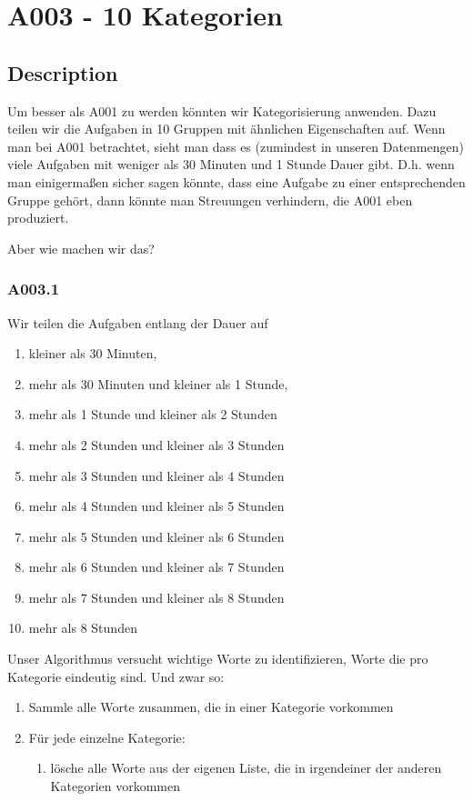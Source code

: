 \newpage{}

\hypertarget{a003---10-categories}{%
\section{A003 - 10 Kategorien}\label{a003---10-categories}}

\hypertarget{description}{%
\subsection{Description}}

Um besser als A001 zu werden könnten wir Kategorisierung anwenden.
Dazu teilen wir die Aufgaben in 10 Gruppen mit ähnlichen Eigenschaften auf.
Wenn man bei A001 betrachtet, sieht man dass es (zumindest in unseren Datenmengen) viele Aufgaben mit weniger als 30 Minuten und 1 Stunde Dauer gibt. D.h. wenn man einigermaßen sicher sagen könnte, dass eine Aufgabe zu einer entsprechenden Gruppe gehört, dann könnte man Streuungen verhindern, die A001 eben produziert.

Aber wie machen wir das?

\subsubsection{A003.1}

Wir teilen die Aufgaben entlang der Dauer auf
\begin{enumerate}
\tightlist
\item kleiner als 30 Minuten,
\item mehr als 30 Minuten und kleiner als 1 Stunde,
\item mehr als 1 Stunde und kleiner als 2 Stunden
\item mehr als 2 Stunden und kleiner als 3 Stunden
\item mehr als 3 Stunden und kleiner als 4 Stunden
\item mehr als 4 Stunden und kleiner als 5 Stunden
\item mehr als 5 Stunden und kleiner als 6 Stunden
\item mehr als 6 Stunden und kleiner als 7 Stunden
\item mehr als 7 Stunden und kleiner als 8 Stunden
\item mehr als 8 Stunden
\end{enumerate}

Unser Algorithmus versucht wichtige Worte zu identifizieren, Worte die pro Kategorie eindeutig sind. Und zwar so:
\begin{enumerate}
\tightlist
\item Sammle alle Worte zusammen, die in einer Kategorie vorkommen
\item Für jede einzelne Kategorie:
    \begin{enumerate}
        \tightlist
        \item lösche alle Worte aus der eigenen Liste, die in irgendeiner der anderen Kategorien vorkommen
    \end{enumerate}
\end{enumerate}